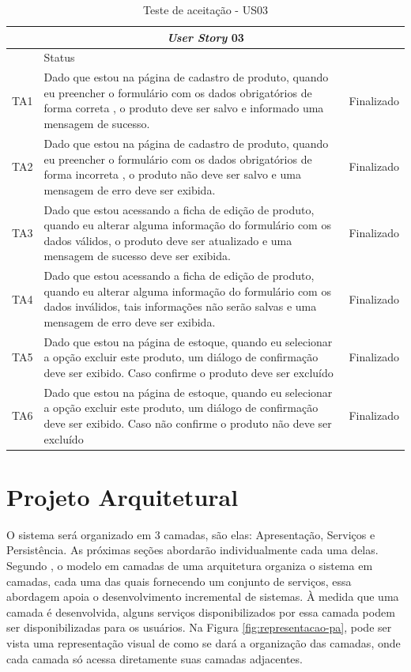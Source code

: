 \documentclass[a4paper,12pt]{monografia}
\begin{document}
\begin{longtable}{|l|p{11.8cm}|c|}
\caption{Teste de aceitação - US03}
\label{quadro:teste-aceitacaoi-us03}
\hline
\multicolumn{3}{|c|}{\textbf{\textit{User Story} 03}}\\
\hline		
\rowcolor{ballblue}
\multicolumn{2}{|c|}{Testes de aceitação} & Status\\	
\hline
TA1 & Dado que estou na página de cadastro de produto, quando eu preencher o formulário com os dados obrigatórios de forma correta , o produto deve ser salvo e informado uma mensagem de sucesso.   & Finalizado\\
\hline
TA2 & Dado que estou na página de cadastro de produto, quando eu preencher o formulário com os dados obrigatórios de forma incorreta , o produto não deve ser salvo e uma mensagem de erro deve ser exibida.   & Finalizado\\
\hline
TA3 & Dado que estou acessando a ficha de edição de produto, quando eu alterar alguma informação do formulário com os dados válidos, o produto deve ser atualizado e uma mensagem de sucesso deve ser exibida.   & Finalizado\\
\hline
TA4 & Dado que estou acessando a ficha de edição de produto, quando eu alterar alguma informação do formulário com os dados inválidos, tais informações não serão salvas e uma mensagem de erro deve ser exibida.   & Finalizado\\
\hline
TA5 & Dado que estou na página de estoque, quando eu selecionar a opção excluir este produto, um diálogo de confirmação deve ser exibido. Caso confirme o produto deve ser excluído  & Finalizado\\
\hline
TA6 & Dado que estou na página de estoque, quando eu selecionar a opção excluir este produto, um diálogo de confirmação deve ser exibido. Caso não confirme o produto não deve ser excluído  & Finalizado\\
\hline
\end{longtable}


\section{Projeto Arquitetural} %
\label{sec:projeto_arquitetural}

O sistema será organizado em 3 camadas, são elas: Apresentação, Serviços e Persistência. As próximas seções abordarão individualmente cada uma delas. Segundo , o modelo em camadas de uma arquitetura organiza o sistema em camadas, cada uma das quais fornecendo um conjunto de serviços, essa abordagem apoia o desenvolvimento incremental de sistemas. À medida que uma camada é desenvolvida, alguns serviços disponibilizados por essa camada podem ser disponibilizadas para os usuários. Na Figura \ref{fig:representacao-pa}, pode ser vista uma representação visual de como se dará a organização das camadas, onde cada camada só acessa diretamente suas camadas adjacentes.
\end{document}
